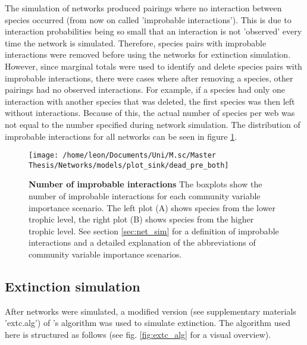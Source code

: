 \documentclass[12pt,a4paper]{article}
\begin{document}
	 The simulation of networks produced pairings where no interaction between species occurred (from now on called 'improbable interactions'). This is due to interaction probabilities being so small that an interaction is not 'observed' every time the network is simulated. Therefore, species pairs with improbable interactions were removed before using the networks for extinction simulation. However, since marginal totals were used to identify and delete species pairs with improbable interactions, there were cases where after removing a species, other pairings had no observed interactions. For example, if a species had only one interaction with another species that was deleted, the first species was then left without interactions. Because of this, the actual number of species per web was not equal to the number specified during network simulation. The distribution of improbable interactions for all networks can be seen in figure \ref{fig:dead_int}.

\begin{figure}[H]
	 \texttt{[image: /home/leon/Documents/Uni/M.sc/Master Thesis/Networks/models/plot\_sink/dead\_pre\_both]}
	 \caption{\textbf{Number of improbable interactions} The boxplots show the number of improbable interactions for each community variable importance scenario.
	 The left plot (A) shows species from the lower trophic level, the right plot (B) shows species from the higher trophic level. See section \ref{sec:net_sim} for a definition of improbable interactions and a detailed explanation of the abbreviations of community variable importance scenarios.}
	 \label{fig:dead_int}
\end{figure}


	\subsection{Extinction simulation} \label{sec:extc_sim}
	After networks were simulated, a modified version (see supplementary materials 'extc.alg') of \citeauthor{Vizentin-Bugoni2019}'s algorithm was used to simulate extinction. The algorithm used here is structured as follows (see fig. \ref{fig:extc_alg} for a visual overview). 
\end{document}

